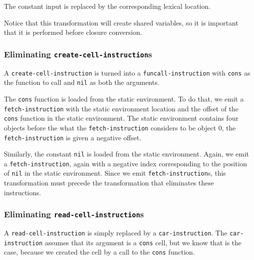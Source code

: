 The constant input is replaced by the corresponding lexical location.

Notice that this transformation will create shared variables, so it is
important that it is performed before closure conversion.

\subsubsection{Eliminating \texttt{create-cell-instruction}s}

A \texttt{create-cell-instruction} is turned into a
\texttt{funcall-instruction} with \texttt{cons} as the function to
call and \texttt{nil} as both the arguments.

The \texttt{cons} function is loaded from the static environment.  To
do that, we emit a \texttt{fetch-instruction} with the static
environment location and the offset of the \texttt{cons} function in
the static environment.  The static environment contains four objects
before the what the \texttt{fetch-instruction} considers to be object
$0$, the \texttt{fetch-instruction} is given a negative offset.

Similarly, the constant \texttt{nil} is loaded from the static
environment.  Again, we emit a \texttt{fetch-instruction}, again with
a negative index corresponding to the position of \texttt{nil} in the
static environment.  Since we emit \texttt{fetch-instruction}s, this
transformation must precede the transformation that eliminates
these instructions.%

\subsubsection{Eliminating \texttt{read-cell-instruction}s}

A \texttt{read-cell-instruction} is simply replaced by a
\texttt{car-instruction}.  The \texttt{car-instruction} assumes that
its argument is a \texttt{cons} cell, but we know that is the case,
because we created the cell by a call to the \texttt{cons} function.

